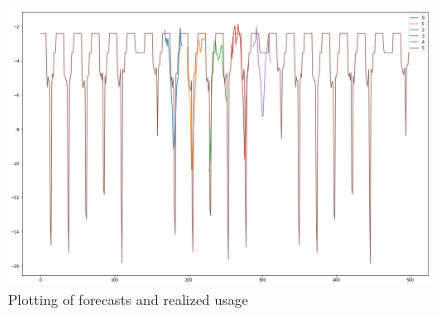 \begin{figure}
    \centering
    \includegraphics[width=1.0\linewidth]{img/pred1.png}
    \caption{Plotting of forecasts and realized usage}
    \label{fig:imgcombined_model}
\end{figure}



%


